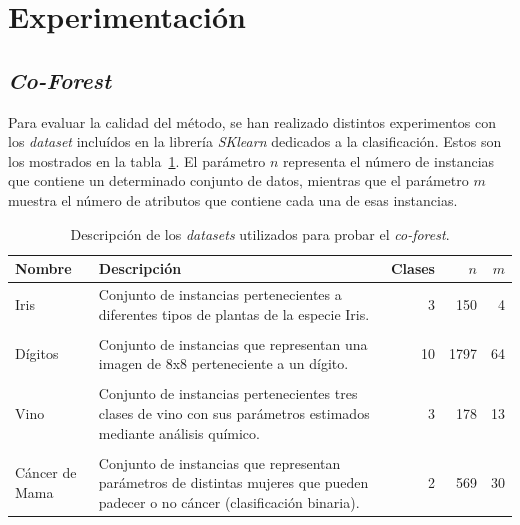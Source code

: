 


\section{Experimentación}

\subsection{\textit{Co-Forest}}

Para evaluar la calidad del método, se han realizado distintos experimentos con los \textit{dataset} incluídos en la librería \textit{SKlearn} dedicados a la clasificación. Estos son los mostrados en la tabla~\ref{tabla_datasets_sklearn}. El parámetro $n$ representa el número de instancias que contiene un determinado conjunto de datos, mientras que el parámetro $m$ muestra el número de atributos que contiene cada una de esas instancias.

\begin{table}
	\small
	\begin{centering}
		
		\begin{tabular}{@{}p{4em} p{20em} r r r @{}}
			\toprule
			\textbf{Nombre} & \textbf{Descripción} & \textbf{Clases} & $n$ & $m$\\ 
			\midrule
			
			Iris & Conjunto de instancias pertenecientes a diferentes tipos de plantas de la especie Iris. & 3 & 150 & 4 \\\\
			Dígitos & Conjunto de instancias que representan una imagen de 8x8 perteneciente a un dígito. & 10 & 1797 & 64 \\\\
			Vino & Conjunto de instancias pertenecientes tres clases de vino con sus parámetros estimados mediante análisis químico. & 3 & 178 & 13 \\\\
			Cáncer de Mama & Conjunto de instancias que representan parámetros de distintas mujeres que pueden padecer o no cáncer (clasificación binaria). & 2 & 569 & 30 \\
		\end{tabular}
		
	\end{centering}
	\caption{Descripción de los \textit{datasets} utilizados para probar el \textit{co-forest}.}
	\label{tabla_datasets_sklearn}	
\end{table}



